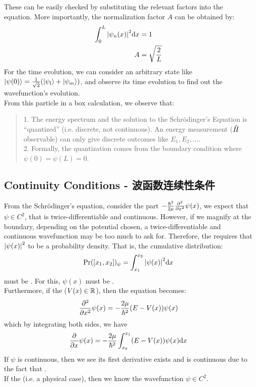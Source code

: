 These can be easily checked by substituting the relevant factors into the equation. More importantly, the normalization factor $A$ can be obtained by:
\begin{align*}
    \int_{0}^{L} \abs{\psi_n(x)}^2 \dd x &= 1 \\
    A &= \sqrt{\frac{2}{L}}
\end{align*}
For the time evolution, we can consider an arbitrary state like $\ket{\psi(0)} = \frac{1}{\sqrt{2}}(\ket{\psi_l} + \ket{\psi_m})$, and observe its time evolution to find out the wavefunction's evolution. \\
From this particle in a box calculation, we observe that:
\begin{quote}
    1. The energy spectrum and the solution to the Schr\"odinger's Equation is ``quantized'' (i.e. discrete, not continuous). An energy measurement ($\hat{H}$ observable) can only give discrete outcomes like $E_1, E_2, \dots$. \\
    2. Formally, the quantization comes from the boundary condition where $\psi(0) = \psi(L) = 0$.
\end{quote}

\subsection{Continuity Conditions - 波函数连续性条件}
From the Schr\"odinger's equation, consider the part $-\frac{\hbar^2}{2\mu}\pdv[2]{x} \psi(x)$, we expect that $\psi \in C^2$, that is twice-differentiable and continuous. However, if we magnify at the boundary, depending on the potential chosen, a twice-differentiable and continuous wavefunction may be too much to ask for. Therefore, the  requires that $\abs{\psi(x)}^2$ to be a probability density. That is, the cumulative distribution:
$$\text{Pr}([x_1, x_2])_\psi = \int_{x_1}^{x_2} \abs{\psi(x)}^2 \dd x$$
must be . For this, $\psi(x)$ must be . \\
Furthermore, if the  ($V(x) \in \mathbb{R}$), then the equation becomes:
$$\pdv[2]{x} \psi(x) = -\frac{2\mu}{\hbar^2}(E - V(x))\psi(x)$$
which by integrating both sides, we have
$$\pdv{x} \psi(x) = -\frac{2\mu}{\hbar^2} \int_{x_0}^{x_1} (E - V(x))\psi(x) \dd x$$
If $\psi$ is continuous, then we see its first derivative exists and is continuous due to the fact that . \\
If the  (i.e. a physical case), then we know the wavefunction $\psi \in C^2$.

